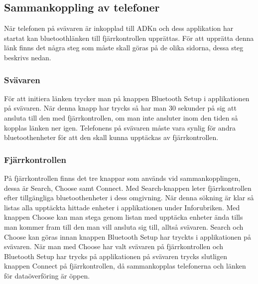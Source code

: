 \subsection{Sammankoppling av telefoner}

När telefonen på svävaren är inkopplad till ADKn och dess applikation har startat kan
bluetoothlänken till fjärrkontrollen upprättas. För att upprätta denna länk finns det några steg som måste skall göras på de olika sidorna, dessa steg beskrivs nedan.

\subsubsection{Svävaren}

För att initiera länken trycker man på knappen Bluetooth Setup i applikationen på svävaren.
När denna knapp har trycks så har man 30 sekunder på sig att ansluta till den med fjärrkontrollen, om man inte ansluter inom den tiden så kopplas länken ner igen.
Telefonens på svävaren måste vara synlig för andra bluetoothenheter för att den skall kunna upptäckas av fjärrkontrollen.



\subsubsection{Fjärrkontrollen}

På fjärrkontrollen finns det tre knappar som används vid sammankopplingen, dessa är Search, Choose samt Connect. Med Search-knappen leter fjärrkontrollen efter tillgängliga bluetoothenheter i dess omgivning. När denna sökning är klar så listas alla upptäckta hittade enheter i applikationen under Inforubriken. Med knappen Choose kan man stega genom listan med upptäcka enheter ända tills man kommer fram till den man vill ansluta sig till, alltså svävaren.
Search och Choose kan göras innan knappen Bluetooth Setup har tryckts i applikationen på svävaren. När man med Choose har valt svävaren på fjärrkontrollen och Bluetooth Setup har trycks på applikationen på svävaren trycks slutligen knappen Connect på fjärrkontrollen, då sammankopplas telefonerna och länken för dataöverföring är öppen.

